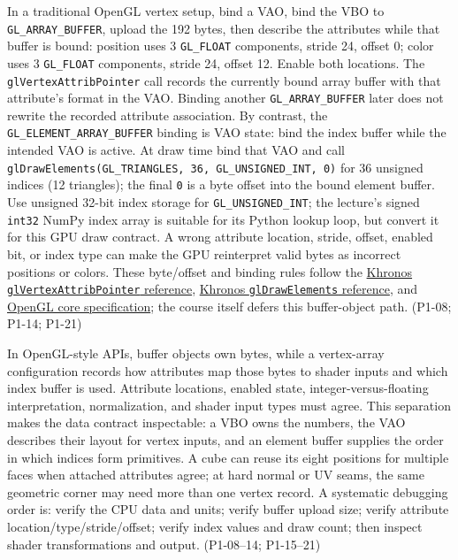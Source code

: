 In a traditional OpenGL vertex setup, bind a VAO, bind the VBO to \texttt{GL\_ARRAY\_BUFFER}, upload the 192 bytes, then describe the attributes while that buffer is bound: position uses 3 \texttt{GL\_FLOAT} components, stride 24, offset 0; color uses 3 \texttt{GL\_FLOAT} components, stride 24, offset 12. Enable both locations. The \texttt{glVertexAttribPointer} call records the currently bound array buffer with that attribute's format in the VAO. Binding another \texttt{GL\_ARRAY\_BUFFER} later does not rewrite the recorded attribute association. By contrast, the \texttt{GL\_ELEMENT\_ARRAY\_BUFFER} binding is VAO state: bind the index buffer while the intended VAO is active. At draw time bind that VAO and call \texttt{glDrawElements(GL\_TRIANGLES,\ 36,\ GL\_UNSIGNED\_INT,\ 0)} for 36 unsigned indices (12 triangles); the final \texttt{0} is a byte offset into the bound element buffer. Use unsigned 32-bit index storage for \texttt{GL\_UNSIGNED\_INT}; the lecture's signed \texttt{int32} NumPy index array is suitable for its Python lookup loop, but convert it for this GPU draw contract. A wrong attribute location, stride, offset, enabled bit, or index type can make the GPU reinterpret valid bytes as incorrect positions or colors. These byte/offset and binding rules follow the \href{https://registry.khronos.org/OpenGL-Refpages/gl4/html/glVertexAttribPointer.xhtml}{Khronos \texttt{glVertexAttribPointer} reference}, \href{https://registry.khronos.org/OpenGL-Refpages/gl4/html/glDrawElements.xhtml}{Khronos \texttt{glDrawElements} reference}, and \href{https://registry.khronos.org/OpenGL/specs/gl/glspec43.core.pdf}{OpenGL core specification}; the course itself defers this buffer-object path. (P1-08; P1-14; P1-21)

In OpenGL-style APIs, buffer objects own bytes, while a vertex-array configuration records how attributes map those bytes to shader inputs and which index buffer is used. Attribute locations, enabled state, integer-versus-floating interpretation, normalization, and shader input types must agree. This separation makes the data contract inspectable: a VBO owns the numbers, the VAO describes their layout for vertex inputs, and an element buffer supplies the order in which indices form primitives. A cube can reuse its eight positions for multiple faces when attached attributes agree; at hard normal or UV seams, the same geometric corner may need more than one vertex record. A systematic debugging order is: verify the CPU data and units; verify buffer upload size; verify attribute location/type/stride/offset; verify index values and draw count; then inspect shader transformations and output. (P1-08--14; P1-15--21)

